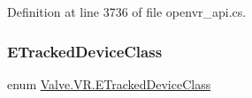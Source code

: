 Definition at line 3736 of file openvr\+\_\+api.\+cs.

\mbox{\label{namespace_valve_1_1_v_r_aa1a3c2765fe53acb85372a57652c47a1}} 
\subsubsection{\texorpdfstring{ETrackedDeviceClass}{ETrackedDeviceClass}}
{\footnotesize\ttfamily enum \mbox{\hyperlink{namespace_valve_1_1_v_r_aa1a3c2765fe53acb85372a57652c47a1}{Valve.\+V\+R.\+E\+Tracked\+Device\+Class}}\hspace{0.3cm}{\ttfamily [strong]}}

